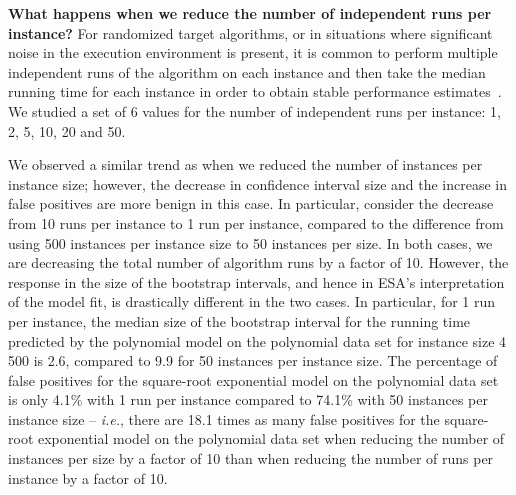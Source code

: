 \documentclass[aic]{iosart2x}
\newcommand{\ie}{\emph{i.e.}}
\begin{document}
\textbf{What happens when we reduce the number of independent runs per instance?}
For randomized target algorithms, or in situations where significant noise in the execution environment is present, it is common to perform multiple independent runs of the algorithm on each instance and then take the median running time for each instance in order to obtain stable performance estimates~\cite{Sun09}.
We studied a set of 6 values for the number of independent runs per instance: 1, 2, 5, 10, 20 and 50. 

We observed a similar trend as when we reduced the number of instances per instance size; however, the decrease in confidence interval size and the increase in false positives are more benign in this case. 
In particular, consider the decrease from 10 runs per instance to 1 run per instance, compared to the difference from using 500 instances per instance size to 50 instances per size. 
In both cases, we are decreasing the total number of algorithm runs by a factor of 10. 
However, the response in the size of the bootstrap intervals, and hence in ESA's interpretation of the model fit, is drastically different in the two cases. 
In particular, for 1 run per instance, the median size of the bootstrap interval for the running time predicted by the polynomial model on the polynomial data set for instance size 4\,500 is 2.6, compared to 9.9 for 50 instances per instance size. 
The percentage of false positives for the square-root exponential model on the polynomial data set is only 4.1\% with 1 run per instance compared to 74.1\% with 50 instances per instance size -- \ie{}, there are 18.1 times as many false positives for the square-root exponential model on the polynomial data set when reducing the number of instances per size by a factor of 10 than when reducing the number of runs per instance by a factor of 10. 
\end{document}
